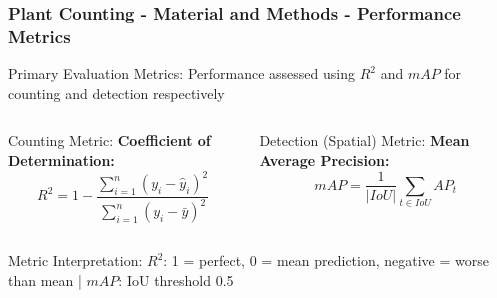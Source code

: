 \documentclass[aspectratio=43]{beamer}
\begin{document}
\begin{frame}
    \frametitle{\small Plant Counting - Material and Methods - Performance Metrics}
    
    \begin{block}{Primary Evaluation Metrics:}
        \small Performance assessed using $R^2$ and $mAP$ for counting and detection respectively
    \end{block}
    
    \begin{columns}
        \begin{column}{0.5\textwidth}
            \begin{exampleblock}{Counting Metric:}
                \scriptsize
                \textbf{Coefficient of Determination:}
                $$R^2 = 1 - \frac{\sum_{i=1}^{n} (y_i - \hat{y}_i)^2}{\sum_{i=1}^{n} (y_i - \bar{y})^2}$$
            \end{exampleblock}
        \end{column}
        
        \begin{column}{0.5\textwidth}
                \scriptsize
            \begin{alertblock}{Detection (Spatial) Metric:}
                \scriptsize
                \textbf{Mean Average Precision:}
                $$mAP = \frac{1}{|IoU|}\sum_{t \in IoU}AP_t$$
             \end{alertblock}
        \end{column}
    \end{columns}
    
    \begin{block}{Metric Interpretation:}
        \scriptsize
        $R^2$: 1 = perfect, 0 = mean prediction, negative = worse than mean | $mAP$: IoU threshold 0.5 %
    \end{block}
\end{frame}
\end{document}

